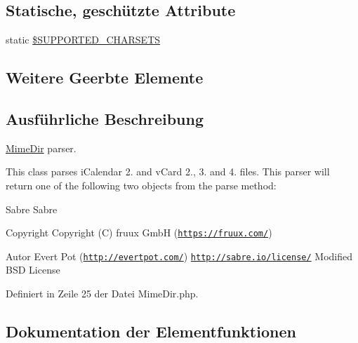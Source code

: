 \subsection*{Statische, geschützte Attribute}
\begin{DoxyCompactItemize}
\item 
static \mbox{\hyperlink{class_sabre_1_1_v_object_1_1_parser_1_1_mime_dir_a6a798dcef34f4364d4a2ba11bd00bfd6}{\$\+S\+U\+P\+P\+O\+R\+T\+E\+D\+\_\+\+C\+H\+A\+R\+S\+E\+TS}}
\end{DoxyCompactItemize}
\subsection*{Weitere Geerbte Elemente}


\subsection{Ausführliche Beschreibung}
\mbox{\hyperlink{class_sabre_1_1_v_object_1_1_parser_1_1_mime_dir}{Mime\+Dir}} parser.

This class parses i\+Calendar 2. and v\+Card 2., 3. and 4. files. This parser will return one of the following two objects from the parse method\+:

Sabre Sabre

\begin{DoxyCopyright}{Copyright}
Copyright (C) fruux GmbH (\href{https://fruux.com/}{\tt https\+://fruux.\+com/}) 
\end{DoxyCopyright}
\begin{DoxyAuthor}{Autor}
Evert Pot (\href{http://evertpot.com/}{\tt http\+://evertpot.\+com/})  \href{http://sabre.io/license/}{\tt http\+://sabre.\+io/license/} Modified B\+SD License 
\end{DoxyAuthor}


Definiert in Zeile 25 der Datei Mime\+Dir.\+php.



\subsection{Dokumentation der Elementfunktionen}
\mbox{\label{class_sabre_1_1_v_object_1_1_parser_1_1_mime_dir_a650b831c2e0cc87e9dd2275531e243e6}} 
